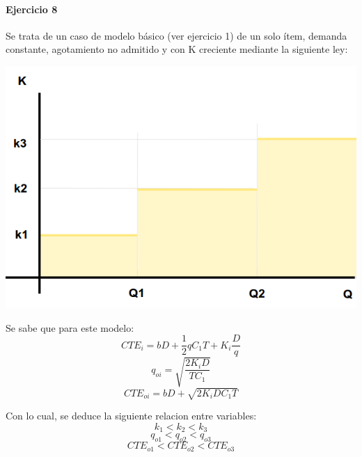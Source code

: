 \documentclass{article}
\begin{document}
\paragraph{Ejercicio 8}
Se trata de un caso de modelo básico (ver ejercicio 1) de un solo ítem, demanda constante, agotamiento no admitido y con K creciente mediante la siguiente ley: 
\begin{center}
  \includegraphics[scale=0.4,keepaspectratio=true]{img/8/8_QvsK.png} 
\end{center}

Se sabe que para este modelo:
  \begin{equation}\label{8_CTE}CTE_i = bD + \frac{1}{2}qC_1T + K_i \frac{D}{q} \end{equation}
  $$ q_{oi} = \sqrt{ \frac{2K_iD}{TC_1}} $$
  $$ CTE_{oi} = bD + \sqrt{ 2K_iDC_1T }$$

Con lo cual, se deduce la siguiente relacion entre variables:
 $$ k_1 < k_2 < k_3 $$
 $$ q_{o1} < q_{o2} < q_{o3}$$
 $$ CTE_{o1} < CTE_{o2} < CTE_{o3} $$
 
\end{document}

